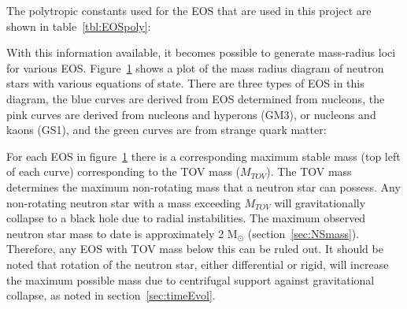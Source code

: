 The polytropic constants used for the EOS that are used in this project are shown in table~\ref{tbl:EOSpoly}:
 \begin{table}[H]
	\begin{center}
		\caption[\protect]{\protect}
		\label{tbl:EOSpoly}
	\end{center}
\end{table}
With this information available, it becomes possible to generate mass-radius loci for various EOS. Figure~\ref{fig:EOS} shows a plot of the mass radius diagram of neutron stars with various equations of state. There are three types of EOS in this diagram, the blue curves are derived from EOS determined from nucleons, the pink curves are derived from nucleons and hyperons (GM3), or nucleons and kaons (GS1), and the green curves are from strange quark matter:
\begin{figure}[H]
	\begin{center}
		\adjincludegraphics[height=7.2cm,trim={0cm 0 0 0},clip]{./img/EOS}
		\caption{\protect}
		\label{fig:EOS}
	\end{center}
\end{figure}	
For each EOS in figure~\ref{fig:EOS} there is a corresponding maximum stable mass (top left of each curve) corresponding to the TOV mass ($M_{TOV}$). The TOV mass determines the maximum non-rotating mass that a neutron star can possess. Any non-rotating neutron star with a mass exceeding $M_{TOV}$ will gravitationally collapse to a black hole due to radial instabilities. The maximum observed neutron star mass to date is approximately 2 M$_\odot$ \citep{Antoniadis2013,Demorest2010} (section~\ref{sec:NSmass}).  Therefore, any EOS with TOV mass below this can be ruled out. It should be noted that rotation of the neutron star, either differential or rigid, will increase the maximum possible mass due to centrifugal support against gravitational collapse, as noted in section~\ref{sec:timeEvol}. 


